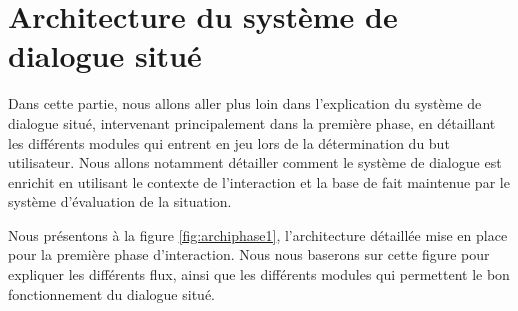 \documentclass[a4paper,11pt,twoside]{StyleThese}
\begin{document}




\section{Architecture du système de dialogue situé}

Dans cette partie, nous allons aller plus loin dans l'explication du système de dialogue situé, intervenant principalement dans la première phase, en détaillant les différents modules qui entrent en jeu lors de la détermination du but utilisateur. Nous allons notamment détailler comment le système de dialogue est enrichit en utilisant le contexte de l'interaction et la base de fait maintenue par le système d'évaluation de la situation.

Nous présentons à la figure \ref{fig:archiphase1}, l'architecture détaillée mise en place pour la première phase d'interaction. Nous nous baserons sur cette figure pour expliquer les différents flux, ainsi que les différents modules qui permettent le bon fonctionnement du dialogue situé.
\end{document}
